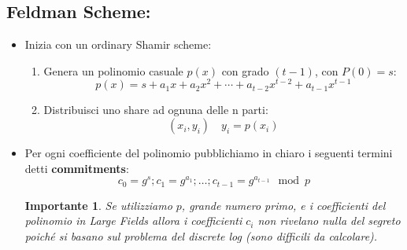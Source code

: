 \documentclass{book}
\newtheorem*{Importante}{\textbf{Importante}}
\begin{document}
\subsection{Feldman Scheme:\@dealer}
\begin{itemize}
    \item Inizia con un ordinary Shamir scheme:\begin{enumerate}
              \item Genera un polinomio casuale \(p(x)\) con grado \((t-1)\), con \(P(0)=s\):
                    \begin{equation*}
                        p(x)=s+a_{1}x+a_{2}x^{2}+\cdots+a_{t-2}x^{t-2}+a_{t-1}x^{t-1}
                    \end{equation*}
              \item Distribuisci uno share ad ognuna delle n parti:\begin{equation*}
                        (x_{i},y_{i})\quad y_{i}=p(x_{i})
                    \end{equation*}
          \end{enumerate}
    \item Per ogni coefficiente del polinomio pubblichiamo in chiaro i seguenti termini detti \textbf{commitments}:\begin{equation*}
              c_{0}=g^{s};c_{1}=g^{a_{1}};\ldots;c_{t-1}=g^{a_{t-1}}\mod{p}
          \end{equation*}
          \begin{Importante}
              Se utilizziamo \(p\), grande numero primo, e i coefficienti del polinomio in \emph{Large Fields} allora i coefficienti \(c_{i}\) non rivelano nulla del segreto poiché si basano sul problema del discrete log (sono difficili da calcolare).
          \end{Importante}
\end{itemize}
\end{document}

